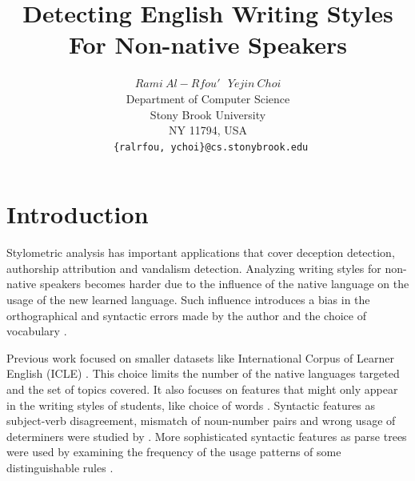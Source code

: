 \documentclass[10pt,a5paper,twoside]{article}
\title{Detecting English Writing Styles For Non-native Speakers}
\author{$Rami~Al-Rfou'~~~Yejin~Choi$ \\
  Department of Computer Science \\
  Stony Brook University \\
  NY 11794, USA \\
  \texttt{ \{ralrfou, ychoi\}@cs.stonybrook.edu}}
\begin{document}
\maketitle
{}


\newpage

\section{Introduction}
Stylometric analysis has important applications that cover deception detection, authorship attribution and vandalism detection.
Analyzing writing styles for non-native speakers becomes harder due to the influence of the native language on the usage of the new learned language.
Such influence introduces a bias in the orthographical and syntactic errors made by the author and the choice of vocabulary \cite{koppel2005automatically}.

Previous work focused on smaller datasets like {International Corpus of Learner English} (ICLE) \cite{koppel2005automatically, koppel2005determining, argamon2009automatically}. This choice limits the number of the native languages targeted and the set of topics covered.
It also focuses on features that might only appear in the writing styles of
students, like choice of words \cite{tsur2007using, zheng2003authorship,
gamon2004linguistic}. Syntactic features as subject-verb disagreement, mismatch of noun-number pairs and wrong usage of determiners were studied by \cite{wong2009contrastive}. More sophisticated syntactic features as parse trees were used by examining the frequency of the usage patterns of some distinguishable rules \cite{wong2010parser, wongdras2011EMNLP}.
\end{document}
